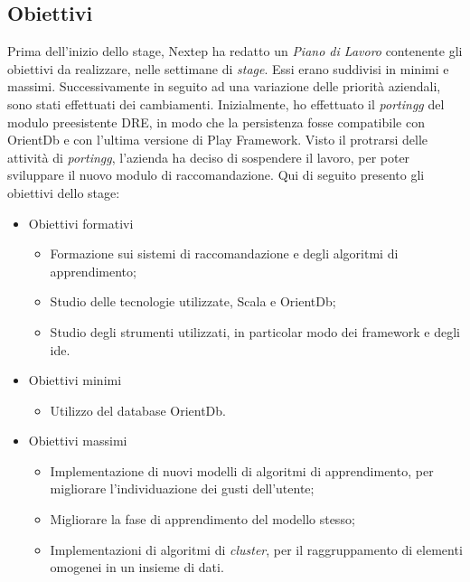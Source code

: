 \subsection{Obiettivi}
Prima dell'inizio dello stage, Nextep ha redatto un \emph{Piano di Lavoro} contenente gli obiettivi da realizzare, nelle settimane di \emph{stage}. Essi erano suddivisi in minimi e massimi. Successivamente in seguito ad una variazione delle priorità aziendali, sono stati effettuati dei cambiamenti. Inizialmente, ho effettuato il \emph{\gls{portingg}} del modulo preesistente DRE, in modo che la persistenza fosse compatibile con OrientDb e con l'ultima versione di Play Framework. Visto il protrarsi delle attività di \emph{\gls{portingg}}, l'azienda ha deciso di sospendere il lavoro, per poter sviluppare il nuovo modulo di raccomandazione.
\newpage
Qui di seguito presento gli obiettivi dello stage:
\begin{itemize}
\item Obiettivi formativi
\begin{itemize}
\item Formazione sui sistemi di raccomandazione e degli algoritmi di apprendimento;
\item Studio delle tecnologie utilizzate, Scala e OrientDb;
\item Studio degli strumenti utilizzati, in particolar modo dei \gls{framework} e degli \gls{ide}.
\end{itemize}
\item Obiettivi minimi
\begin{itemize}
\item Utilizzo del database OrientDb.
\end{itemize}
\item Obiettivi massimi
\begin{itemize}
\item Implementazione di nuovi modelli di algoritmi di apprendimento, per migliorare l'individuazione dei gusti dell'utente;
\item Migliorare la fase di apprendimento del modello stesso;
\item Implementazioni di algoritmi di \emph{cluster}, per il raggruppamento di elementi omogenei in un insieme di dati.
\end{itemize}
\end{itemize}




